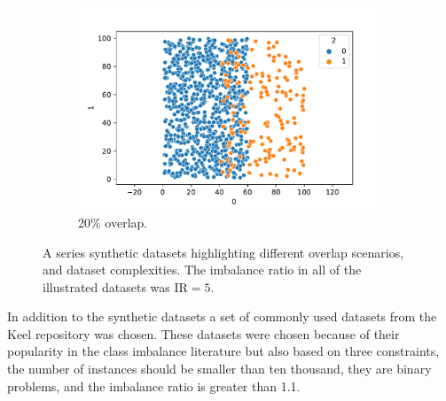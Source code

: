 \documentclass[twoside,leqno,twocolumn]{article}
\newcommand{\JG}[1]{\todo[color=green!20,author=Goettcke]{#1}}
\begin{document}
\begin{figure}
\begin{subfigure}[b]{0.24\textwidth}
    \end{subfigure}
    \hfill
    \begin{subfigure}[b]{0.24\textwidth}  
        \centering 
        \includegraphics[width=\textwidth]{plots/synthetic_dataset_visualizations/uniform_overlap_0.83_0.17_20_1000.csv.pdf}
        \caption[]%
        {{\small 20\% overlap.}}    
        \label{fig:uniform_overlap_20}
    \end{subfigure}
    \caption[]
    {\small A series synthetic datasets highlighting different overlap scenarios, and dataset complexities. The imbalance ratio in all of the illustrated datasets was $\text{IR}=5$.} 
    \label{fig:mean and std of nets}
\end{figure}
In addition to the synthetic datasets a set of commonly used datasets from the Keel repository \JG{Insert citation} was chosen. These datasets were chosen because of their popularity in the class imbalance literature but also based on three constraints, the number of instances should be smaller than ten thousand, they are binary problems, and the imbalance ratio is greater than 1.1.   
\end{document}
